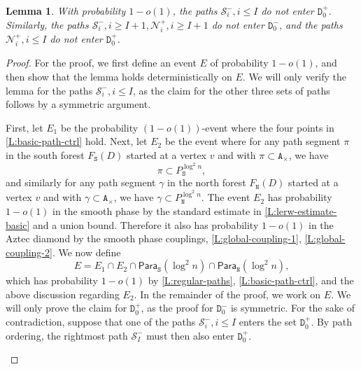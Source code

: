 \documentclass[10pt,a4paper]{amsart}
\newtheorem{lem}{Lemma}
\newcommand{\cN}{\mathcal{N}}
\newcommand{\cS}{\mathcal{S}}
\renewcommand{\tt}[1]{{\mathtt{#1}}}
\begin{document}
	\begin{lem}
		\label{L:QSE-pass}
		With probability $1 - o(1)$, the paths $\cS_i^-, i \le I$ do not enter $\tt{D}^+_0$. Similarly, the paths $\cS_i^-, i \ge I + 1, \cN_i^+, i \ge I + 1$ do not enter $\tt{D}^-_0$, and the paths $\cN_i^+, i \le I$ do not enter $\tt{D}^+_0$.
	\end{lem}

	\begin{proof}
		For the proof, we first define an event $E$ of probability $1 - o(1)$, and then show that the lemma holds deterministically on $E$. We will only verify the lemma for the paths $\cS_i^-, i \le I$, as the claim for the other three sets of paths follows by a symmetric argument.

      
		
		First, let $E_1$ be the probability $(1 - o(1))$-event where the four points in \cref{L:basic-path-ctrl} hold. Next, let $E_2$ be the event where for any path segment $\pi$ in the south forest $F_\tt{S}(D)$ started at a vertex $v$ and with $\pi \subset \tt{A}_\times$, we have
		\begin{equation}
			\label{E:pi-P}
			\pi \subset P_\tt{S}^{\log^2 n},
		\end{equation}
		and similarly for any path segment $\gamma$ in the north forest $F_\tt{N}(D)$ started at a vertex $v$ and with $\gamma \subset \tt{A}_\times$, we have	$\gamma \subset P_\tt{N}^{\log^2 n}$. The event $E_2$ has probability $1 - o(1)$ in the smooth phase by the standard estimate in \cref{L:lerw-estimate-basic} and a union bound. Therefore it also has probability $1 - o(1)$ in the Aztec diamond by the smooth phase couplings, \cref{L:global-coupling-1}, \ref{L:global-coupling-2}.
		We now define
		$$
		E = E_1 \cap E_2 \cap \mathsf{Para}_\tt{S}(\log^2 n) \cap \mathsf{Para}_\tt{N}(\log^2 n),
		$$
		which has probability $1 - o(1)$ by \cref{L:regular-paths},  \cref{L:basic-path-ctrl}, and the above discussion regarding $E_2$. In the remainder of the proof, we work on $E$. We will only prove the claim for $\tt{D}^+_0$, as the proof for $\tt{D}^-_0$ is symmetric. 	For the sake of contradiction, suppose that one of the paths $\cS_i^-, i \le I$ enters the set $\tt{D}^+_0$. By path ordering, the rightmost path $\cS_I^-$ must then also enter $\tt{D}^+_0$. 

          \begin{figure}
            \centering
            

\end{figure}
\end{proof}
\end{document}
